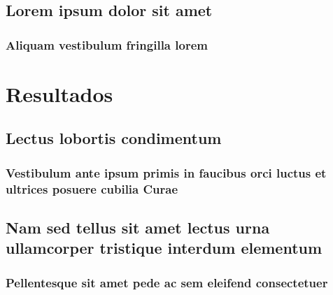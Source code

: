 \documentclass[
12pt,				%
openright,			%
twoside,			%
a4paper,			%
hyphens,
english,			%
french,				%
spanish,			%
brazil				%
]{abntex2}
\begin{document}
		\chapter{Lorem ipsum dolor sit amet}
		
		\section{Aliquam vestibulum fringilla lorem}
		
		\lipsum[1]
		
		\lipsum[2-3]
		
		\part{Resultados}
		
		\chapter{Lectus lobortis condimentum}
		
		\section{Vestibulum ante ipsum primis in faucibus orci luctus et ultrices
			posuere cubilia Curae}
		
		\lipsum[21-22]
		
		\chapter{Nam sed tellus sit amet lectus urna ullamcorper tristique interdum
			elementum}
		
		\section{Pellentesque sit amet pede ac sem eleifend consectetuer}
		
		\lipsum[24]
		
		
\end{document}
